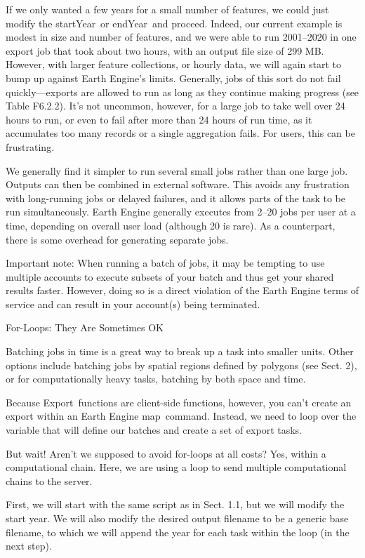 \documentclass[
  letterpaper,
  DIV=11,
  numbers=noendperiod]{scrreprt}
\begin{document}
If we only wanted a few years for a small number of features, we could
just modify the startYear~or endYear~and proceed. Indeed, our current
example is modest in size and number of features, and we were able to
run 2001--2020 in one export job that took about two hours, with an
output file size of 299 MB. However, with larger feature collections, or
hourly data, we will again start to bump up against Earth Engine's
limits. Generally, jobs of this sort do not fail quickly---exports are
allowed to run as long as they continue making progress (see Table
F6.2.2). It's not uncommon, however, for a large job to take well over
24 hours to run, or even to fail after more than 24 hours of run time,
as it accumulates too many records or a single aggregation fails. For
users, this can be frustrating.

We generally find it simpler to run several small jobs rather than one
large job. Outputs can then be combined in external software. This
avoids any frustration with long-running jobs or delayed failures, and
it allows parts of the task to be run simultaneously. Earth Engine
generally executes from 2--20 jobs per user at a time, depending on
overall user load (although 20 is rare). As a counterpart, there is some
overhead for generating separate jobs.

Important note: When running a batch of jobs, it may be tempting to use
multiple accounts to execute subsets of your batch and thus get your
shared results faster. However, doing so is a direct violation of the
Earth Engine terms of service and can result in your account(s) being
terminated.

For-Loops: They Are Sometimes OK

Batching jobs in time is a great way to break up a task into smaller
units. Other options include batching jobs by spatial regions defined by
polygons (see Sect. 2), or for computationally heavy tasks, batching by
both space and time.

Because Export~functions are client-side functions, however, you can't
create an export within an Earth Engine map~command. Instead, we need to
loop over the variable that will define our batches and create a set of
export tasks.

But wait! Aren't we supposed to avoid for-loops at all costs? Yes,
within a computational chain. Here, we are using a loop to send multiple
computational chains to the server.

First, we will start with the same script as in Sect. 1.1, but we will
modify the start year. We will also modify the desired output filename
to be a generic base filename, to which we will append the year for each
task within the loop (in the next step).
\end{document}
